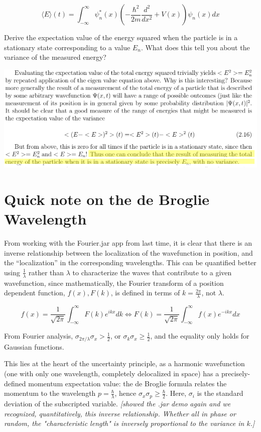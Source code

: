 \documentclass{article}
\begin{document}
$$\langle E \rangle (t) = \int_{- \infty}^\infty \psi^*_n(x) \left( - \frac{\hbar^2}{2m} \frac{d^2}{dx^2} + V(x) \right) \psi_n(x) dx$$


Derive the expectation value of the energy squared when the particle is in a stationary state corresponding to a value $E_n$.  What does this tell you about the variance of the measured energy?


\includegraphics[width = 0.8 \textwidth]{Lecture04/2.png}

\section{Quick note on the de Broglie Wavelength}


From working with the Fourier.jar app from last time, it is clear that there is an inverse relationship between the localization of the wavefunction in position, and the “localization” in the corresponding wavelengths.  This can be quantified better using $\frac{1}{\lambda}$  rather than $\lambda$ to characterize the waves that contribute to a given wavefunction, since mathematically, the Fourier transform of a position dependent function, $f(x), F(k)$, is defined in terms of $k = \frac{2 \pi}{\lambda}$, not $\lambda$. 

$$f(x) = \frac{1}{\sqrt{2 \pi}} \int_{- \infty}^\infty F(k) e^{i k x} dk \Leftrightarrow F(k) = \frac{1}{\sqrt{2 \pi}} \int_{- \infty}^\infty f(x) e^{-i k x} dx$$

From Fourier analysis, $\sigma_{2 \pi / \lambda} \sigma_x > \frac{1}{2}$, or $\sigma_k \sigma_x \geq \frac{1}{2}$, and the equality only holds for Gaussian functions. 

This lies at the heart of the uncertainty principle, as a harmonic wavefunction (one with only one wavelength, completely delocalized in space) has a precisely-defined momentum expectation value: the de Broglie formula relates the momentum to the wavelength $p = \frac{\hbar}{\lambda}$, hence $\sigma_x \sigma_p \geq \frac{\hbar}{2}$. Here, $\sigma_i$ is the standard deviation of the subscripted variable. 
\textit{[showed the .jar demo again and we recognized, quantitatively, this inverse relationship. Whether all in phase or random, the "characteristic length" is inversely proportional to the variance in $k$.]}
\end{document}
